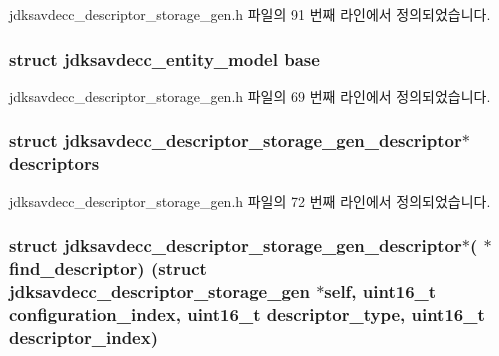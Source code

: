 jdksavdecc\+\_\+descriptor\+\_\+storage\+\_\+gen.\+h 파일의 91 번째 라인에서 정의되었습니다.

\subsubsection[{\texorpdfstring{base}{base}}]{\setlength{\rightskip}{0pt plus 5cm}struct {\bf jdksavdecc\+\_\+entity\+\_\+model} base}\hypertarget{structjdksavdecc__descriptor__storage__gen_ab9b4b2eaa5e1a290a371291da6a9a4d6}{}\label{structjdksavdecc__descriptor__storage__gen_ab9b4b2eaa5e1a290a371291da6a9a4d6}


jdksavdecc\+\_\+descriptor\+\_\+storage\+\_\+gen.\+h 파일의 69 번째 라인에서 정의되었습니다.

\subsubsection[{\texorpdfstring{descriptors}{descriptors}}]{\setlength{\rightskip}{0pt plus 5cm}struct {\bf jdksavdecc\+\_\+descriptor\+\_\+storage\+\_\+gen\+\_\+descriptor}$\ast$ descriptors}\hypertarget{structjdksavdecc__descriptor__storage__gen_ab8ad060f3f5389caccce4de2ec9c2f30}{}\label{structjdksavdecc__descriptor__storage__gen_ab8ad060f3f5389caccce4de2ec9c2f30}


jdksavdecc\+\_\+descriptor\+\_\+storage\+\_\+gen.\+h 파일의 72 번째 라인에서 정의되었습니다.

\subsubsection[{\texorpdfstring{find\+\_\+descriptor}{find_descriptor}}]{\setlength{\rightskip}{0pt plus 5cm}struct {\bf jdksavdecc\+\_\+descriptor\+\_\+storage\+\_\+gen\+\_\+descriptor}$\ast$( $\ast$ find\+\_\+descriptor) (struct {\bf jdksavdecc\+\_\+descriptor\+\_\+storage\+\_\+gen} $\ast$self, uint16\+\_\+t configuration\+\_\+index, uint16\+\_\+t descriptor\+\_\+type, uint16\+\_\+t descriptor\+\_\+index)}\hypertarget{structjdksavdecc__descriptor__storage__gen_a2271ec05cf2e18cbea4645e73d8fda34}{}\label{structjdksavdecc__descriptor__storage__gen_a2271ec05cf2e18cbea4645e73d8fda34}


